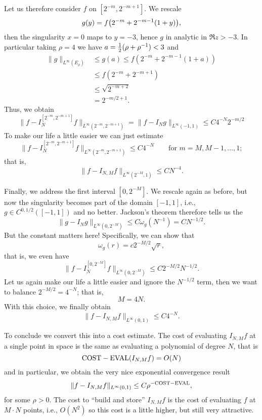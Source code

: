 Let us therefore consider $f$ on $[2^{-m}, 2^{-m+1}]$. We rescale 
\[
    g(y) = f\big(2^{-m} + 2^{-m-1}(1+y)\big),
\]
then the singularity $x = 0$ maps to $y = -3$, hence $g$ in analytic in $\Re z >
-3$. In particular taking $\rho = 4$ we have $a = {\textstyle \frac{1}{2}}(\rho+\rho^{-1}) < 3$ 
and 
\begin{align*}
    \|g\|_{L^\infty(E_\rho)} &\leq g(a) \leq f(2^{-m} + 2^{-m-1}(1+a)) \\
    &\leq  f(2^{-m} + 2^{-m+1}) \\ 
    &\leq \sqrt{2^{-m+2}} \\ 
    &= 2^{-m/2+1}.
\end{align*}
Thus, we obtain 
\[
    \| f - I_N^{[2^{-m},2^{-m+1}]} f\|_{L^\infty(2^{-m},2^{-m+1})}
    =
    \| f - I_N g \|_{L^\infty(-1,1)} 
    \leq C 4^{-N} 2^{-m/2}
\]
To make our life a little easier we can just estimate 
\[
    \| f - I_N^{[2^{-m},2^{-m+1}]} f\|_{L^\infty(2^{-m},2^{-m+1})}
    \leq 
    C 4^{-N} \qquad \text{for } m = M, M-1, \dots, 1;
\]
that is, 
\[
    \| f - I_{N,M} f \|_{L^\infty(2^{-M}, 1)} \leq 
    C N^{-4}.    
\]

Finally, we address the first interval $[0, 2^{-M}]$. We rescale again 
as before, but now the singularity becomes part of the domain $[-1,1]$, i.e.,
$g \in C^{0,1/2}([-1,1])$ and no better. Jackson's theorem therefore tells 
us the 
\[
    \| g - I_N g \|_{L^\infty(0, 2^{-M})}
    \leq 
    C \omega_g(N^{-1}) = C N^{-1/2}.
\]
But the constant matters here! Specifically, we can show that 
\[
    \omega_g(r) = c 2^{-M/2} \sqrt{r},
\]
that is, we even have 
\[
     \|f - I_N^{[0, 2^{-M}]} f \|_{L^\infty(0, 2^{-M})} 
     \leq C 2^{-M/2} N^{-1/2}.
\]
Let us again make our life a little easier and ignore the $N^{-1/2}$ term, then 
we want to balance $2^{-M/2} = 4^{-N}$; that is, 
\[
    M = 4 N.    
\]
With this choice, we finally obtain 
\[
    \| f - I_{N,M} f \|_{L^\infty(0, 1)} \leq C 4^{-N}.
\]

To conclude we convert this into a cost estimate. The cost of evaluating 
$I_{N,M} f$ at a single point in space is the same as evaluating a 
polynomial of degree $N$, that is 
\[
    {\rm COST-EVAL}(I_{N,M} f) = O(N)
\]
and in particular, we obtain the very nice exponential convergence 
result 
\[
    \| f - I_{N,M} f \|_{L^\infty(0, 1)} \leq C \rho^{-{\rm COST-EVAL}},
\]
for some $\rho > 0$. The cost to ``build and store'' $I_{N,M} f$ is the cost of
evaluating $f$ at $M \cdot N$ points, i.e., $O(N^2)$ so this cost is a little
higher, but still very attractive.


